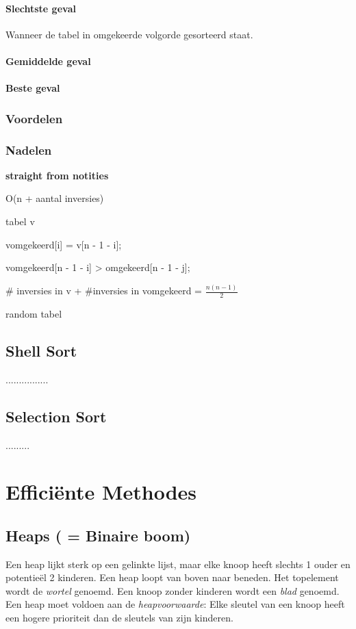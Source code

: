 \documentclass[12pt]{report}
\begin{document}
\subsubsection{Slechtste geval}
Wanneer de tabel in omgekeerde volgorde gesorteerd staat. 
\subsubsection{Gemiddelde geval}

\subsubsection{Beste geval}
\subsection{Voordelen}
\subsection{Nadelen}
\textbf{straight from notities}

O(n + aantal inversies)

tabel v

vomgekeerd[i] = v[n - 1 - i];

vomgekeerd[n - 1 - i] > omgekeerd[n - 1 - j];

\# inversies in v + \#inversies in vomgekeerd = $\frac{n(n - 1)}{2}$



random tabel

\section{Shell Sort}

................


\section{Selection Sort}
.........

\chapter{Efficiënte Methodes}
\section{Heaps ( = Binaire boom)}
Een heap lijkt sterk op een gelinkte lijst, maar elke knoop heeft slechts 1 ouder en potentieël 2 kinderen. Een heap loopt van boven naar beneden. Het topelement wordt de \textit{wortel} genoemd. Een knoop zonder kinderen wordt een \textit{blad} genoemd. Een heap moet voldoen aan de \textit{heapvoorwaarde}: Elke sleutel van een knoop heeft een hogere prioriteit dan de sleutels van zijn kinderen.
\end{document}
